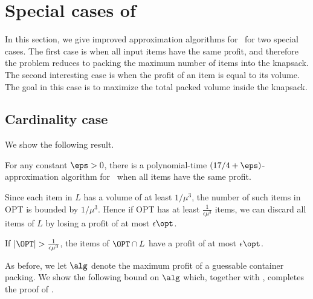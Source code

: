 \section{Special cases of \tdk}
In this section, we give improved approximation algorithms for \tdk~for two special cases. The first case is when all input items have the same profit, and therefore the problem reduces to packing the maximum number of items into the knapsack. The second interesting case is when the profit of an item is equal to its volume. The goal in this case is to maximize the total packed volume inside the knapsack.

\subsection{Cardinality case}
\label{sec:nonrot-cardinality}
We show the following result.

\begin{theorem}
    \label{thm:3dkc}
   For any constant $\eps>0$, there is a polynomial-time $(17/4 +\eps)$-approximation algorithm for \tdk~when all items have the same profit. 
\end{theorem}

Since each item in $L$ has a volume of at least $1/\mu^3$, the number of such items in OPT is bounded by $1/\mu^3$. Hence if OPT has at least $\frac{1}{\epsilon\mu^3}$ items, we can discard all items of $L$ by losing a profit of at most $\epsilon \opt$.

\begin{lemma}
\label{lem:largedelete}
    If $|\OPT|> \frac{1}{\epsilon\mu^3}$, the items of $\OPT\cap L$ have a profit of at most $\epsilon \opt$. 
\end{lemma}


As before, we let $\alg$ denote the maximum profit of a guessable container packing. We show the following bound on $\alg$ which, together with , completes the proof of .


